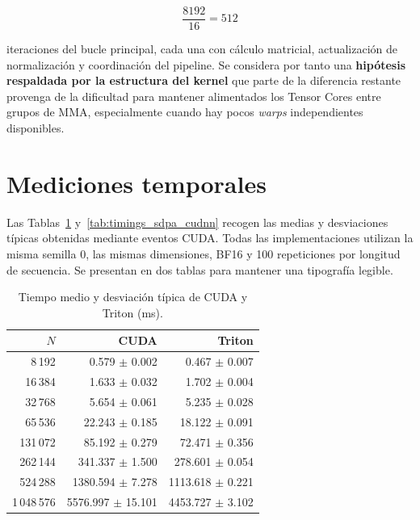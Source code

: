 \begin{equation}
\frac{8192}{16}=512
\end{equation}

iteraciones del bucle principal, cada una con cálculo matricial, actualización de normalización y coordinación del pipeline. Se considera por tanto una \textbf{hipótesis respaldada por la estructura del kernel} que parte de la diferencia restante provenga de la dificultad para mantener alimentados los Tensor Cores entre grupos de MMA, especialmente cuando hay pocos \textit{warps} independientes disponibles.

\section{Mediciones temporales}

Las Tablas~\ref{tab:timings_cuda_triton} y~\ref{tab:timings_sdpa_cudnn} recogen las medias y desviaciones típicas obtenidas mediante eventos CUDA. Todas las implementaciones utilizan la misma semilla 0, las mismas dimensiones, BF16 y 100 repeticiones por longitud de secuencia. Se presentan en dos tablas para mantener una tipografía legible.

\begin{table}[H]
\centering
\caption{Tiempo medio y desviación típica de CUDA y Triton (ms).}
\label{tab:timings_cuda_triton}
\begin{tabular}{rrr}
\toprule
\textbf{\(N\)} & \textbf{CUDA} & \textbf{Triton} \\
\midrule
8\,192       & 0.579 $\pm$ 0.002 & 0.467 $\pm$ 0.007 \\
16\,384      & 1.633 $\pm$ 0.032 & 1.702 $\pm$ 0.004 \\
32\,768      & 5.654 $\pm$ 0.061 & 5.235 $\pm$ 0.028 \\
65\,536      & 22.243 $\pm$ 0.185 & 18.122 $\pm$ 0.091 \\
131\,072     & 85.192 $\pm$ 0.279 & 72.471 $\pm$ 0.356 \\
262\,144     & 341.337 $\pm$ 1.500 & 278.601 $\pm$ 0.054 \\
524\,288     & 1380.594 $\pm$ 7.278 & 1113.618 $\pm$ 0.221 \\
1\,048\,576 & 5576.997 $\pm$ 15.101 & 4453.727 $\pm$ 3.102 \\
\bottomrule
\end{tabular}
\end{table}

